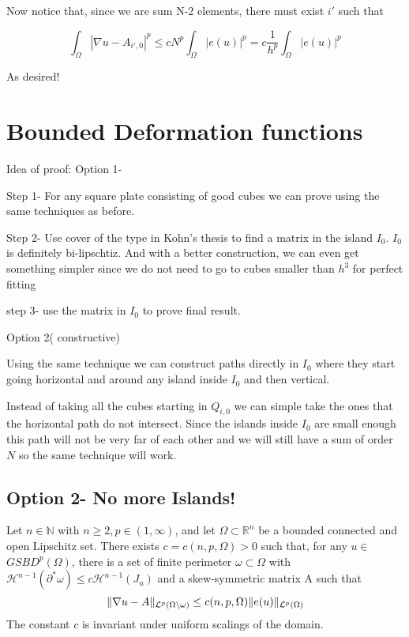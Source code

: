    Now notice that, since we are sum N-2 elements, there must exist $i'$ such that
    
    $$ \int_\Omega |\nabla u - A_{i',0}|^p\leq  cN^{p}\int_\Omega |e(u)|^p=c\frac{1}{h^p}\int_\Omega |e(u)|^p$$
    
    As desired!
    
    \section{Bounded Deformation functions}
    Idea of proof:
    Option 1-
    
    Step 1- For any square plate consisting of good cubes we can prove using the same techniques as before.
    
    Step 2- Use cover of the type in Kohn's thesis to find a matrix in the island $I_0$.
    $I_0$ is definitely bi-lipschtiz. And with a better construction, we can even get something simpler since we do not need to go to cubes smaller than $h^3$ for perfect fitting
    
    step 3- use the matrix in $I_0$ to prove final result.
    
    Option 2( constructive)
    
    Using the same technique we can construct paths directly in $I_0$ where they start going horizontal and around any island inside $I_0$ and then vertical.
    
    Instead of taking all the cubes starting in $Q_{i,0}$ we can simple take the ones that the horizontal path do not intersect. Since the islands inside $I_0$ are small enough this path will not be very far of each other and we will still have a sum of order $N$ so the same technique will work.
    
    
    \subsection{Option 2- No more Islands!}
    
    \begin{theorem}\label{KornBDGeneralDomain}
    Let $n \in \mathbb{N}$ with $n \geq 2, p \in(1, \infty)$, and let $\Omega \subset \mathbb{R}^n$ be a bounded  connected and open Lipschitz set. There exists $c=c(n, p, \Omega)>0$ such that, for any $u \in$ $G S B D^p(\Omega)$, there is a set of finite perimeter $\omega \subset \Omega$ with $\mathcal{H}^{n-1}\left(\partial^* \omega\right) \leq c \mathcal{H}^{n-1}\left(J_u\right)$ and a skew-symmetric matrix A such that
    $$
    \|\nabla u-A\|_{{\mathcal L}^p(\Omega \backslash \omega)} \leq c(n, p, \Omega) \|e(u)\|_{{\mathcal L}^p(\Omega)}
    $$
    The constant $c$ is invariant under uniform scalings of the domain.
    \end{theorem}
    
